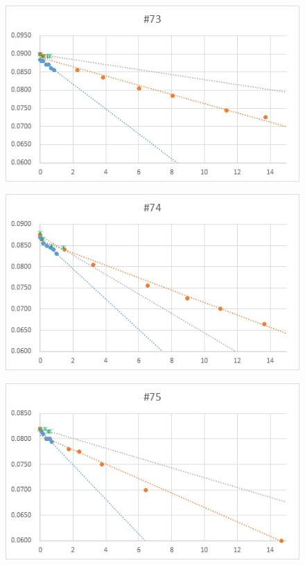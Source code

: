   \begin{figure}[htbp]
    \centering
       \includegraphics[width=120mm]{vol_073.png}
  \end{figure}
  \begin{figure}[htbp]
    \centering
       \includegraphics[width=120mm]{vol_074.png}
  \end{figure}
  \begin{figure}[htbp]
    \centering
       \includegraphics[width=120mm]{vol_075.png}
  \end{figure}
